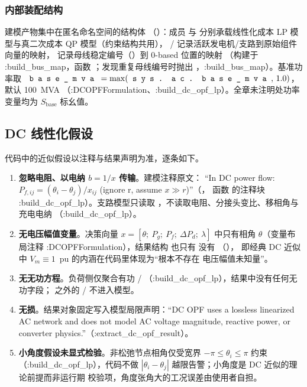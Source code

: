 \subsubsection*{内部装配结构}
建模产物集中在匿名命名空间的结构体 
（）：成员  与
 分别承载线性化成本 LP 模型与真二次成本 QP 模型（约束结构共用），
/ 记录活跃发电机/支路到原始组件向量的映射，
 记录母线稳定编号（）到 0-based 位置的映射
（构建于 :build\_bus\_map，函数 ；发现重复母线编号时抛出
，:build\_bus\_map）。基准功率取
$\fld{base\_mva}=\max(\fld{sys.ac.base\_mva},\,1.0)$，默认 100~MVA
（:DCOPFFormulation、:build\_dc\_opf\_lp）。全章未注明处功率变量均为 $S_{\mathrm{base}}$ 标幺值。

\subsection{DC 线性化假设}\label{subsec:dcopf-assumptions}

代码中的近似假设以注释与结果声明为准，逐条如下。

\begin{enumerate}
  \item \textbf{忽略电阻、以电纳 $b=1/x$ 传输}。建模注释原文：
        ``In DC power flow: $P_{f,ij}=(\theta_i-\theta_j)/x_{ij}$ (ignore r,
        assume $x \gg r$)''（，
        函数  的注释块 :build\_dc\_opf\_lp）。支路模型只读取
        ，不读取电阻、分接头变比、移相角与充电电纳
        （:build\_dc\_opf\_lp）。
  \item \textbf{无电压幅值变量}。决策向量 $x=[\theta;\ P_g;\ P_f;\ \Delta P_d;\
        \lambda]$ 中只有相角 $\theta$（变量布局注释 :DCOPFFormulation），结果结构
         也只有  没有 
        （），
        即经典 DC 近似中 $V_m\equiv 1$~pu 的内涵在代码里体现为“根本不存在
        电压幅值未知量”。
  \item \textbf{无无功方程}。负荷侧仅聚合有功 /
        （:build\_dc\_opf\_lp），结果中没有任何无功字段； 之外的
        \fld{qmin\_mvar}/\fld{qmax\_mvar} 不进入模型。
  \item \textbf{无损}。结果对象固定写入模型局限声明：``DC OPF uses a lossless
        linearized AC network and does not model AC voltage magnitude, reactive
        power, or converter physics.''（:extract\_dc\_opf\_result）。
  \item \textbf{小角度假设未显式检验}。非松弛节点相角仅受宽界
        $-\pi\le\theta_i\le\pi$ 约束（:build\_dc\_opf\_lp），代码不做
        $|\theta_i-\theta_j|$ 越限告警；小角度是 DC 近似的理论前提而非运行期
        校验项，角度张角大的工况误差由使用者自担。
\end{enumerate}

